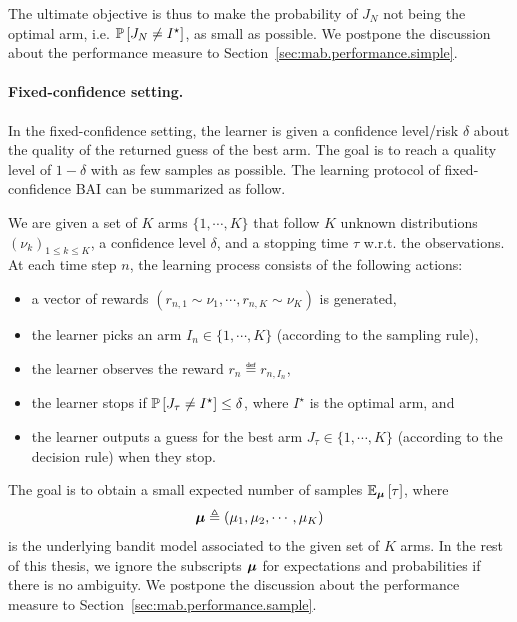 The ultimate objective is thus to make the probability of $J_N$ not being the optimal arm, i.e. $\mathbb{P}\left[J_N\neq I^\star\right]$, as small as possible. We postpone the discussion about the performance measure to Section~\ref{sec:mab.performance.simple}.

\paragraph{Fixed-confidence setting.}

In the fixed-confidence setting, the learner is given a confidence level/risk $\delta$ about the quality of the returned guess of the best arm. The goal is to reach a quality level of $1-\delta$ with as few samples as possible. The learning protocol of fixed-confidence BAI can be summarized as follow.

\begin{definition}\label{def:mab.bai_confidence}
\begin{leftbar}[defnbar]
	We are given a set of $K$ arms $\{1,\cdots,K\}$ that follow $K$ unknown distributions $(\nu_k)_{1 \leq k \leq K}$, a confidence level $\delta$, and a stopping time $\tau$ w.r.t. the observations. At each time step $n$, the learning process consists of the following actions:
\begin{itemize}
	\item a vector of rewards $(r_{n,1} \sim \nu_1, \cdots, r_{n,K} \sim \nu_K)$ is generated,
	\item the learner picks an arm $I_n \in \{1,\cdots,K\}$ (according to the sampling rule),
	\item the learner observes the reward $r_n \eqdef r_{n,I_n}$,
	\item the learner stops if $\mathbb{P}\left[J_{\tau}\neq I^\star\right] \leq \delta$, where $I^\star$ is the optimal arm, and
	\item the learner outputs a guess for the best arm $J_\tau \in \{1,\cdots,K\}$ (according to the decision rule) when they stop.
\end{itemize}
\end{leftbar}
\end{definition}

The goal is to obtain a small expected number of samples $\mathbb{E}_{{\boldsymbol \mu}}\left[\tau\right]$, where 
\[
    {\boldsymbol \mu}\triangleq(\mu_1,\mu_2,\cdots,\mu_K)
\]
is the underlying bandit model associated to the given set of $K$ arms. In the rest of this thesis, we ignore the subscripts ${\boldsymbol \mu}$ for expectations and probabilities if there is no ambiguity. We postpone the discussion about the performance measure to Section~\ref{sec:mab.performance.sample}.

